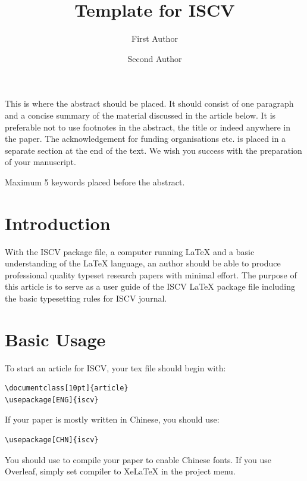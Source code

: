 \documentclass[10pt]{article}
\title{Template for ISCV}
\author{First Author \and Second Author}
\begin{document}
\maketitle

\abstract
This is where the abstract should be placed. It should consist
of one paragraph and a concise summary of the material
discussed in the article below. It is preferable not to use
footnotes in the abstract, the title or indeed anywhere in the paper. 
The acknowledgement for funding organisations etc. is placed in 
a separate section at the end of the text. We wish you success 
with the preparation of your manuscript.

\keywords
Maximum 5 keywords placed before the abstract.

\section{Introduction}
With the ISCV package file, a computer running \LaTeX{} and a basic understanding of the \LaTeX{} language,
an author should be able to produce professional quality typeset research papers with minimal effort.
The purpose of this article is to serve as a user guide of the ISCV \LaTeX{} package file including
the basic typesetting rules for ISCV journal.

\section{Basic Usage}

To start an article for ISCV, your tex file should begin with:
\begin{verbatim}
\documentclass[10pt]{article}
\usepackage[ENG]{iscv}
\end{verbatim}
If your paper is mostly written in Chinese, you should use:
\begin{verbatim}
\usepackage[CHN]{iscv}
\end{verbatim}
You should use  to compile your paper to enable Chinese fonts. If you use Overleaf, simply set compiler to XeLaTeX in the project menu.
\end{document}
